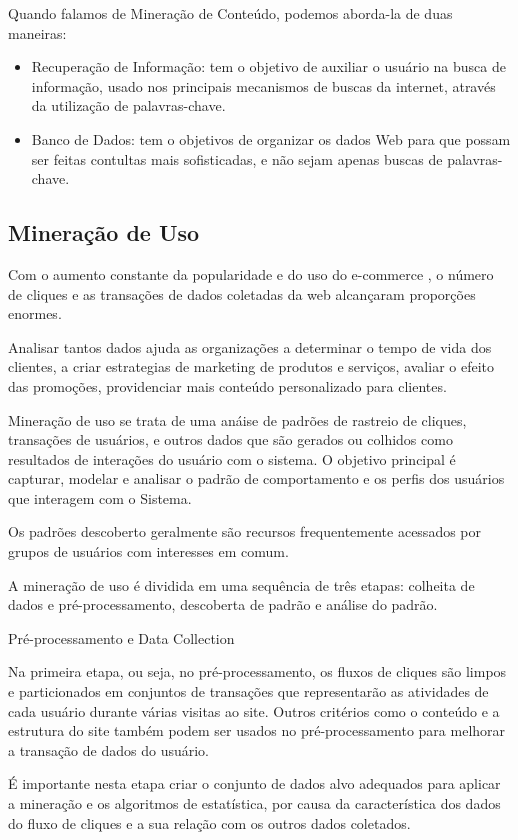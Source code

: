 	Quando falamos de Mineração de Conteúdo, podemos aborda-la de duas maneiras:

\begin{itemize}
\item 	Recuperação de Informação: tem o objetivo de auxiliar o usuário na busca de informação, usado nos principais mecanismos de buscas da internet, através da utilização de palavras-chave.
\item 	Banco de Dados: tem o objetivos de organizar os dados Web para que possam ser feitas contultas mais sofisticadas, e não sejam apenas buscas de palavras-chave.
\end{itemize}

\subsection{Mineração de Uso}
	Com o aumento constante da popularidade e do uso do e-commerce , o número de cliques e as transações de dados coletadas da web alcançaram proporções enormes.

	Analisar tantos dados ajuda as organizações a determinar o tempo de vida dos clientes, a criar estrategias de marketing de produtos e serviços, avaliar o efeito das promoções, providenciar mais conteúdo personalizado para clientes.

	Mineração de uso se trata de uma anáise de padrões de rastreio de cliques, transações de usuários, e outros dados que são gerados ou colhidos como resultados de interações do usuário com o sistema. O objetivo principal é capturar, modelar e analisar o padrão de comportamento e os perfis dos usuários que interagem com o Sistema.

	Os padrões descoberto geralmente são recursos frequentemente acessados por grupos de usuários com interesses em comum.

	A mineração de uso é dividida em uma sequência de três etapas: colheita de dados e pré-processamento, descoberta de padrão e análise do padrão.

	Pré-processamento e Data Collection

	Na primeira etapa, ou seja, no pré-processamento, os fluxos de cliques são limpos e particionados em conjuntos de transações que representarão as atividades de cada usuário durante várias visitas ao site. Outros critérios como o conteúdo e a estrutura do site também podem ser usados no pré-processamento para melhorar a transação de dados do usuário.

	É importante nesta etapa criar o conjunto de dados alvo adequados para aplicar a mineração e os algoritmos de estatística, por causa da característica dos dados do fluxo de cliques e a sua relação com os outros dados coletados.

